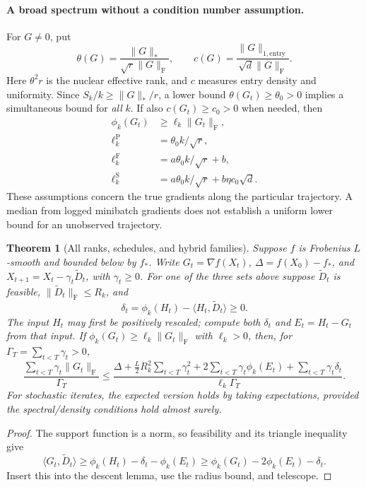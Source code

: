 \documentclass[11pt]{article}
\newtheorem{theorem}{Theorem}[section]
\newcommand{\ip}[2]{\langle #1,#2\rangle}
\newcommand{\F}[1]{\lVert #1\rVert_{\mathrm F}}
\newcommand{\nuc}[1]{\lVert #1\rVert_*}
\newcommand{\ent}[1]{\lVert #1\rVert_{1,\mathrm{entry}}}
\begin{document}
\paragraph{A broad spectrum without a condition number assumption.}
For $G\ne0$, put
\[
 \theta(G)=\frac{\nuc{G}}{\sqrt r\F{G}},\qquad
 c(G)=\frac{\ent{G}}{\sqrt d\F{G}}.
\]
Here $\theta^2r$ is the nuclear effective rank, and $c$ measures entry density
and uniformity. Since $S_k/k\geq\nuc{G}/r$, a lower bound
$\theta(G_t)\geq\theta_0>0$ implies a simultaneous bound for \emph{all} $k$.
If also $c(G_t)\geq c_0>0$ when needed, then
\begin{equation}\label{eq:ell}
\begin{aligned}
 \phi_k(G_t)&\geq \ell_k\F{G_t},\\
 \ell_k^{\mathrm{P}}&=\theta_0 k/\sqrt r,\\
 \ell_k^{\mathrm{F}}&=a\theta_0 k/\sqrt r+b,\\
 \ell_k^{\mathrm{S}}&=a\theta_0 k/\sqrt r+b\eta c_0\sqrt d.
\end{aligned}
\end{equation}
These assumptions concern the true gradients along the particular
trajectory. A median from logged minibatch gradients does not establish a
uniform lower bound for an unobserved trajectory.

\begin{theorem}[All ranks, schedules, and hybrid families]\label{thm:all}
Suppose $f$ is Frobenius $L$-smooth and bounded below by $f_*$.
Write $G_t=\nabla f(X_t)$, $\Delta=f(X_0)-f_*$, and
$X_{t+1}=X_t-\gamma_t\widetilde D_t$, with $\gamma_t\geq0$.
For one of the three sets above suppose $\widetilde D_t$ is feasible,
$\F{\widetilde D_t}\leq R_k$, and
\[
 \delta_t=\phi_k(H_t)-\ip{H_t}{\widetilde D_t}\geq0.
\]
The input $H_t$ may first be positively rescaled; compute both $\delta_t$
and $E_t=H_t-G_t$ from that input.
If $\phi_k(G_t)\geq\ell_k\F{G_t}$ with $\ell_k>0$, then, for
$\Gamma_T=\sum_{t<T}\gamma_t>0$,
\begin{equation}\label{eq:master}
 \frac{\sum_{t<T}\gamma_t\F{G_t}}{\Gamma_T}
 \leq
 \frac{\Delta+\tfrac L2 R_k^2\sum_{t<T}\gamma_t^2
       +2\sum_{t<T}\gamma_t\phi_k(E_t)
       +\sum_{t<T}\gamma_t\delta_t}{\ell_k\Gamma_T}.
\end{equation}
For stochastic iterates, the expected version holds by taking expectations,
provided the spectral/density conditions hold almost surely.
\end{theorem}

\begin{proof}
The support function is a norm, so feasibility and its triangle inequality
give
\[
 \ip{G_t}{\widetilde D_t}
 \geq \phi_k(H_t)-\delta_t-\phi_k(E_t)
 \geq \phi_k(G_t)-2\phi_k(E_t)-\delta_t.
\]
Insert this into the descent lemma, use the radius bound, and telescope.
\end{proof}
\end{document}
